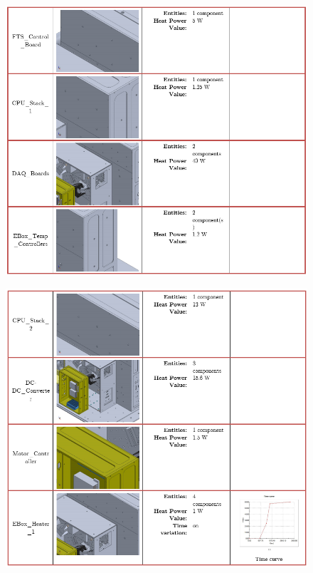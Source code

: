 \begin{figure}
    \centering
    \includegraphics[width=\textwidth]{thermal_load_images/ascent_pt1_TL_images/ascesnt_pt1_3.PNG}
\end{figure}

\begin{figure}
    \centering
    \includegraphics[width=\textwidth]{thermal_load_images/ascent_pt1_TL_images/ascesnt_pt1_4.PNG}
\end{figure}

